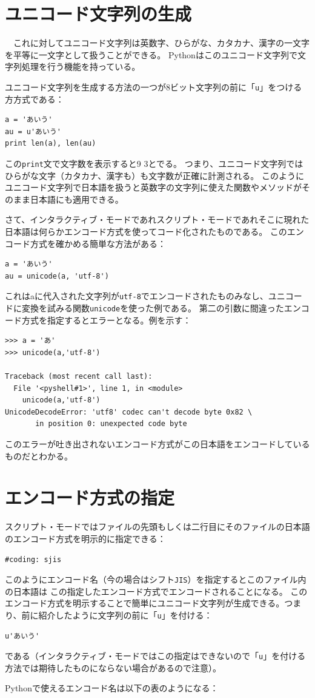 \documentclass[a4j,12pt,makeidx]{jbook}
\begin{document}
\section{ユニコード文字列の生成}
　これに対してユニコード文字列は英数字、ひらがな、カタカナ、漢字の一文字を平等に一文字として扱うことができる。
Pythonはこのユニコード文字列で文字列処理を行う機能を持っている。\par
ユニコード文字列を生成する方法の一つが8ビット文字列の前に「{\tt u}」をつける方方式である：
\begin{verbatim}
a = 'あいう'
au = u'あいう'
print len(a), len(au)
\end{verbatim}
この{\tt print}文で文字数を表示すると9 3とでる。
つまり、ユニコード文字列ではひらがな文字（カタカナ、漢字も）も文字数が正確に計測される。
このようにユニコード文字列で日本語を扱うと英数字の文字列に使えた関数やメソッドがそのまま日本語にも適用できる。\par
さて、インタラクティブ・モードであれスクリプト・モードであれそこに現れた日本語は何らかエンコード方式を使ってコード化されたものである。
このエンコード方式を確かめる簡単な方法がある：
\begin{verbatim}
a = 'あいう'
au = unicode(a, 'utf-8')
\end{verbatim}
これはaに代入された文字列が{\tt utf-8}でエンコードされたものみなし、ユニコードに変換を試みる関数{\tt unicode}を使った例である。
第二の引数に間違ったエンコード方式を指定するとエラーとなる。例を示す：
\begin{verbatim}
>>> a = 'あ'
>>> unicode(a,'utf-8')

Traceback (most recent call last):
  File '<pyshell#1>', line 1, in <module>
    unicode(a,'utf-8')
UnicodeDecodeError: 'utf8' codec can't decode byte 0x82 \ 
       in position 0: unexpected code byte
\end{verbatim}
このエラーが吐き出されないエンコード方式がこの日本語をエンコードしているものだとわかる。
%
\section{エンコード方式の指定}
スクリプト・モードではファイルの先頭もしくは二行目にそのファイルの日本語のエンコード方式を明示的に指定できる：
\begin{verbatim}
#coding: sjis
\end{verbatim}
このようにエンコード名（今の場合はシフト{\tt JIS}）を指定するとこのファイル内の日本語は
この指定したエンコード方式でエンコードされることになる。
このエンコード方式を明示することで簡単にユニコード文字列が生成できる。つまり、前に紹介したように文字列の前に「{\tt u}」を付ける：
\begin{verbatim}
u'あいう'
\end{verbatim}
である（インタラクティブ・モードではこの指定はできないので「{\tt u}」を付ける方法では期待したものにならない場合があるので注意）。\par
Pythonで使えるエンコード名は以下の表のようになる： \\
\end{document}
